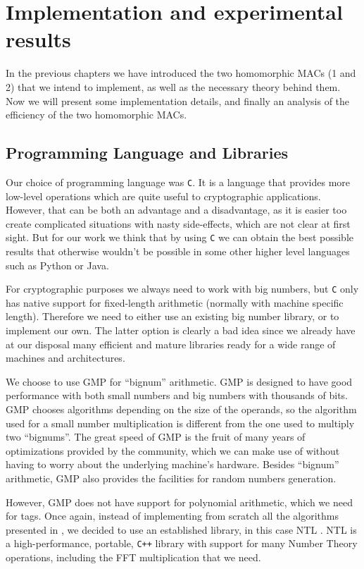 \chapter{Implementation and experimental results}\label{chap:impl}
In the previous chapters we have introduced the two homomorphic MACs
(1 and 2) that
we intend to implement, as well as the necessary theory behind them. Now we
will present some implementation details, and finally an analysis of the
efficiency of the two homomorphic MACs.

\section{Programming Language and Libraries}
Our choice of programming language was \texttt{C}. It is a language that
provides more low-level operations which are quite useful to cryptographic
applications. However, that can be both an advantage and a disadvantage, as it
is easier too create complicated situations with nasty side-effects, which are
not clear at first sight. But for our work we think that by using
\texttt{C} we can obtain the best possible results that otherwise wouldn't be
possible in some other higher level languages such as Python or Java.

For cryptographic purposes we always need to work with big numbers, but
\texttt{C} only has native support for fixed-length arithmetic (normally with
machine specific length). Therefore we need to either use an existing big
number library, or to implement our own. The latter option is clearly a bad
idea since we already have at our disposal many efficient and mature libraries
ready for a wide range of machines and architectures.

We choose to use GMP \cite{gmp} for ``bignum'' arithmetic. GMP is designed to
have good performance with both small numbers and big numbers with thousands of
bits. GMP chooses algorithms depending on the size of the operands, so the
algorithm used for a small number multiplication is different from the one used
to multiply two ``bignums''. The great speed of GMP is the fruit of many years
of optimizations provided by the community, which we can make use of without
having to worry about the underlying machine's hardware.  Besides ``bignum''
arithmetic, GMP also provides the facilities for random numbers generation.

However, GMP does not have support for polynomial arithmetic, which we need for
 tags. Once again, instead of implementing from
scratch all the algorithms presented in , we decided
to use an established library, in this case NTL \cite{ntl}.  NTL is
a high-performance, portable, \texttt{C++} library with support for many Number
Theory operations, including the FFT multiplication that we need\footnotemark.

